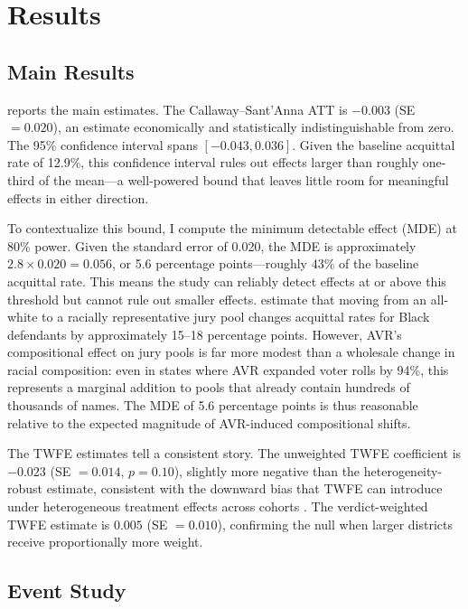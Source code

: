 \documentclass[12pt]{article}
\begin{document}
\section{Results}

\subsection{Main Results}



 reports the main estimates. The Callaway--Sant'Anna ATT is $-0.003$ (SE $= 0.020$), an estimate economically and statistically indistinguishable from zero. The 95\% confidence interval spans $[-0.043, 0.036]$. Given the baseline acquittal rate of 12.9\%, this confidence interval rules out effects larger than roughly one-third of the mean---a well-powered bound that leaves little room for meaningful effects in either direction.

To contextualize this bound, I compute the minimum detectable effect (MDE) at 80\% power. Given the standard error of 0.020, the MDE is approximately $2.8 \times 0.020 = 0.056$, or 5.6 percentage points---roughly 43\% of the baseline acquittal rate. This means the study can reliably detect effects at or above this threshold but cannot rule out smaller effects. \citet{anwar2012impact} estimate that moving from an all-white to a racially representative jury pool changes acquittal rates for Black defendants by approximately 15--18 percentage points. However, AVR's compositional effect on jury pools is far more modest than a wholesale change in racial composition: even in states where AVR expanded voter rolls by 94\%, this represents a marginal addition to pools that already contain hundreds of thousands of names. The MDE of 5.6 percentage points is thus reasonable relative to the expected magnitude of AVR-induced compositional shifts.

The TWFE estimates tell a consistent story. The unweighted TWFE coefficient is $-0.023$ (SE $= 0.014$, $p = 0.10$), slightly more negative than the heterogeneity-robust estimate, consistent with the downward bias that TWFE can introduce under heterogeneous treatment effects across cohorts \citep{goodmanbacon2021difference}. The verdict-weighted TWFE estimate is $0.005$ (SE $= 0.010$), confirming the null when larger districts receive proportionally more weight.

\subsection{Event Study}
\end{document}
